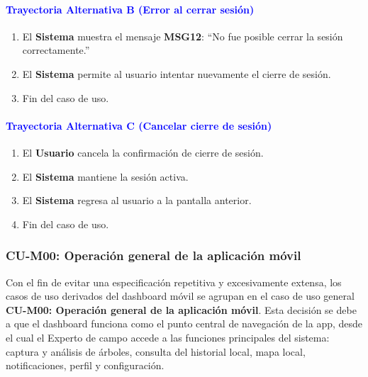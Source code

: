 \paragraph{\textbf{\textcolor{blue}{Trayectoria Alternativa B (Error al cerrar sesión)}}}
\begin{enumerate}
    \item El \textbf{Sistema} muestra el mensaje \textbf{MSG12}: ``No fue posible cerrar la sesión correctamente.''
    \item El \textbf{Sistema} permite al usuario intentar nuevamente el cierre de sesión.
    \item Fin del caso de uso.
\end{enumerate}

\paragraph{\textbf{\textcolor{blue}{Trayectoria Alternativa C (Cancelar cierre de sesión)}}}
\begin{enumerate}
    \item El \textbf{Usuario} cancela la confirmación de cierre de sesión.
    \item El \textbf{Sistema} mantiene la sesión activa.
    \item El \textbf{Sistema} regresa al usuario a la pantalla anterior.
    \item Fin del caso de uso.
\end{enumerate}

\newpage
\subsubsection{CU-M00: Operación general de la aplicación móvil}

Con el fin de evitar una especificación repetitiva y excesivamente extensa, los casos de uso derivados del dashboard móvil se agrupan en el caso de uso general \textbf{CU-M00: Operación general de la aplicación móvil}. Esta decisión se debe a que el dashboard funciona como el punto central de navegación de la app, desde el cual el Experto de campo accede a las funciones principales del sistema: captura y análisis de árboles, consulta del historial local, mapa local, notificaciones, perfil y configuración.

